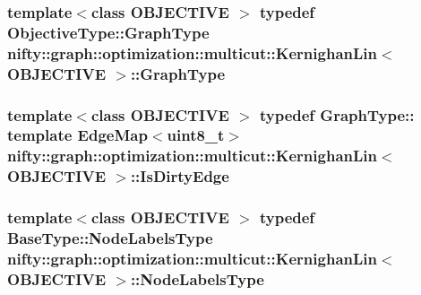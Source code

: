 \subsubsection[{Graph\+Type}]{\setlength{\rightskip}{0pt plus 5cm}template$<$class O\+B\+J\+E\+C\+T\+I\+V\+E $>$ typedef Objective\+Type\+::\+Graph\+Type {\bf nifty\+::graph\+::optimization\+::multicut\+::\+Kernighan\+Lin}$<$ O\+B\+J\+E\+C\+T\+I\+V\+E $>$\+::{\bf Graph\+Type}}\label{classnifty_1_1graph_1_1optimization_1_1multicut_1_1KernighanLin_a73f825f093cf1738ca9c57f3fd2eb71d}
\hypertarget{classnifty_1_1graph_1_1optimization_1_1multicut_1_1KernighanLin_a1e754b856f021f4cc312c03d833fb90f}{}
\subsubsection[{Is\+Dirty\+Edge}]{\setlength{\rightskip}{0pt plus 5cm}template$<$class O\+B\+J\+E\+C\+T\+I\+V\+E $>$ typedef Graph\+Type\+:: template Edge\+Map$<$uint8\+\_\+t$>$ {\bf nifty\+::graph\+::optimization\+::multicut\+::\+Kernighan\+Lin}$<$ O\+B\+J\+E\+C\+T\+I\+V\+E $>$\+::{\bf Is\+Dirty\+Edge}}\label{classnifty_1_1graph_1_1optimization_1_1multicut_1_1KernighanLin_a1e754b856f021f4cc312c03d833fb90f}
\hypertarget{classnifty_1_1graph_1_1optimization_1_1multicut_1_1KernighanLin_a40cce2b5f9facb3e70c3bc6c6616ba6e}{}
\subsubsection[{Node\+Labels\+Type}]{\setlength{\rightskip}{0pt plus 5cm}template$<$class O\+B\+J\+E\+C\+T\+I\+V\+E $>$ typedef {\bf Base\+Type\+::\+Node\+Labels\+Type} {\bf nifty\+::graph\+::optimization\+::multicut\+::\+Kernighan\+Lin}$<$ O\+B\+J\+E\+C\+T\+I\+V\+E $>$\+::{\bf Node\+Labels\+Type}}\label{classnifty_1_1graph_1_1optimization_1_1multicut_1_1KernighanLin_a40cce2b5f9facb3e70c3bc6c6616ba6e}
\hypertarget{classnifty_1_1graph_1_1optimization_1_1multicut_1_1KernighanLin_abf00a316ed89c91b44806040d63757fd}{}
